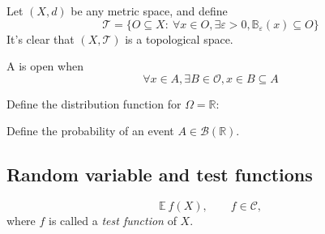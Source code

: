 \begin{example}
Let $(X,d)$ be any metric space, and define
\[
\mathcal{T}=\{
O\subseteq X:~
\forall x\in O, \exists\varepsilon>0,
\mathbb{B}_{\varepsilon}(x)\subseteq O
\}
\]
It's clear that $(X,\mathcal{T})$ is a topological space.
\end{example}




\begin{definition}
A is open when
\[
\forall x\in A,\exists B\in\mathcal{O}, x\in B\subseteq A
\]
\end{definition}


Define the distribution function for $\Omega=\mathbb{R}$:

Define the probability of an event $A\in\mathcal{B}(\mathbb{R})$.


\subsection{Random variable and test functions}
\[
\mathbb{E}~f(X),\qquad f\in\mathcal{C},
\]
where $f$ is called a \emph{test function} of $X$.









